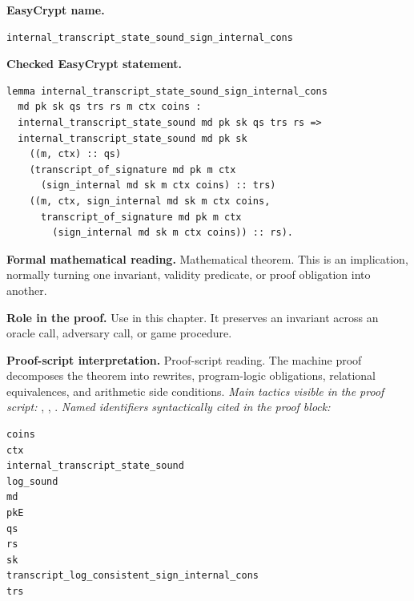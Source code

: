 \begin{formaltheorem}
\noindent\textbf{EasyCrypt name.}
\begin{lstlisting}[language=EasyCrypt,basicstyle=\ttfamily\scriptsize]
internal_transcript_state_sound_sign_internal_cons
\end{lstlisting}
\noindent\textbf{Checked EasyCrypt statement.}
\begin{lstlisting}[language=EasyCrypt,basicstyle=\ttfamily\scriptsize]
lemma internal_transcript_state_sound_sign_internal_cons
  md pk sk qs trs rs m ctx coins :
  internal_transcript_state_sound md pk sk qs trs rs =>
  internal_transcript_state_sound md pk sk
    ((m, ctx) :: qs)
    (transcript_of_signature md pk m ctx
      (sign_internal md sk m ctx coins) :: trs)
    ((m, ctx, sign_internal md sk m ctx coins,
      transcript_of_signature md pk m ctx
        (sign_internal md sk m ctx coins)) :: rs).
\end{lstlisting}
\noindent\textbf{Formal mathematical reading.}
Mathematical theorem. This is an implication, normally turning one invariant, validity predicate, or proof obligation into another.

\noindent\textbf{Role in the proof.}
Use in this chapter. It preserves an invariant across an oracle call, adversary call, or game procedure.

\noindent\textbf{Proof-script interpretation.}
Proof-script reading. The machine proof decomposes the theorem into rewrites, program-logic obligations, relational equivalences, and arithmetic side conditions.
\emph{Main tactics visible in the proof script:} , , .
\emph{Named identifiers syntactically cited in the proof block:}
\begin{lstlisting}[language=EasyCrypt,basicstyle=\ttfamily\scriptsize]
coins
ctx
internal_transcript_state_sound
log_sound
md
pkE
qs
rs
sk
transcript_log_consistent_sign_internal_cons
trs
\end{lstlisting}

\end{formaltheorem}

